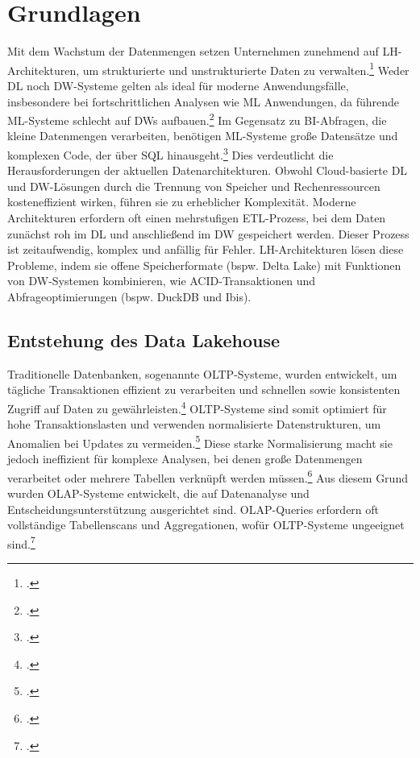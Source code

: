 \chapter{Grundlagen}\label{chapter:Grundlagen}
Mit dem Wachstum der Datenmengen setzen Unternehmen zunehmend auf \ac{LH}-Architekturen, um strukturierte und unstrukturierte Daten zu verwalten.\footcite[Vgl.][S. 1]{armbrustLakehouseNewGeneration2021} 
Weder \ac{DL} noch \ac{DW}-Systeme gelten als ideal für moderne Anwendungsfälle, insbesondere bei fortschrittlichen Analysen wie \ac{ML} Anwendungen, da führende \ac{ML}-Systeme schlecht auf \ac{DW}s aufbauen.\footcite[Vgl.][S. 5]{mazumdarDataLakehouseData2023} 
Im Gegensatz zu \ac{BI}-Abfragen, die kleine Datenmengen verarbeiten, benötigen \ac{ML}-Systeme große Datensätze und komplexen Code, der über \ac{SQL} hinausgeht.\footcite[Vgl.][S. 1]{armbrustLakehouseNewGeneration2021}  
Dies verdeutlicht die Herausforderungen der aktuellen Datenarchitekturen. 
Obwohl Cloud-basierte \ac{DL} und \ac{DW}-Lösungen durch die Trennung von Speicher und Rechenressourcen kosteneffizient wirken, führen sie zu erheblicher Komplexität.
Moderne Architekturen erfordern oft einen mehrstufigen \ac{ETL}-Prozess, bei dem Daten zunächst roh im \ac{DL} und anschließend im \ac{DW} gespeichert werden. Dieser Prozess ist zeitaufwendig, komplex und anfällig für Fehler. \ac{LH}-Architekturen lösen diese Probleme, indem sie offene Speicherformate (bspw. Delta Lake) mit Funktionen von \ac{DW}-Systemen kombinieren, wie \ac{ACID}-Transaktionen und Abfrageoptimierungen (bspw. DuckDB und Ibis).

\section{Entstehung des Data Lakehouse}
Traditionelle Datenbanken, sogenannte \ac{OLTP}-Systeme, wurden entwickelt, um tägliche Transaktionen effizient zu verarbeiten und schnellen sowie konsistenten Zugriff auf Daten zu gewährleisten.\footcite[Vgl.][45]{vaismanDataWarehouseSystems2014} 
\ac{OLTP}-Systeme sind somit optimiert für hohe Transaktionslasten und verwenden normalisierte Datenstrukturen, um Anomalien bei Updates zu vermeiden.\footcite[Vgl.][45 ff.]{vaismanDataWarehouseSystems2014} 
Diese starke Normalisierung macht sie jedoch ineffizient für komplexe Analysen, bei denen große Datenmengen verarbeitet oder mehrere Tabellen verknüpft werden müssen.\footcite[Vgl.][45 ff.]{vaismanDataWarehouseSystems2014}  
Aus diesem Grund wurden \ac{OLAP}-Systeme entwickelt, die auf Datenanalyse und Entscheidungsunterstützung ausgerichtet sind. \ac{OLAP}-Queries erfordern oft vollständige Tabellenscans und Aggregationen, wofür \ac{OLTP}-Systeme ungeeignet sind.\footcite[Vgl.][46]{vaismanDataWarehouseSystems2014} 

